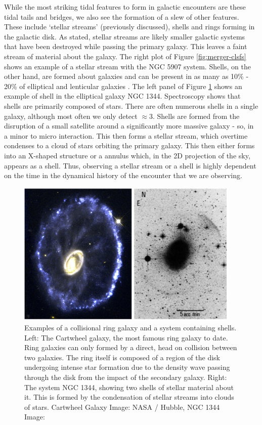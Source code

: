 While the most striking tidal features to form in galactic encounters are these tidal tails and bridges, we also see the formation of a slew of other features. These include `stellar streams' (previously discussed), shells and rings forming in the galactic disk. As stated, stellar streams are likely smaller galactic systems that have been destroyed while passing the primary galaxy. This leaves a faint stream of material about the galaxy. The right plot of Figure \ref{fig:merger-clsfs} shows an example of a stellar stream with the NGC 5907 system. Shells, on the other hand, are formed about galaxies and can be present in as many as 10\% - 20\% of elliptical and lenticular galaxies \citep{1983ApJ...274..534M, 2013ApJ...765...28A}. The left panel of Figure \ref{fig:tidal-features-ex} shows an example of shell in the elliptical galaxy NGC 1344. Spectroscopy shows that shells are primarily composed of stars. There are often numerous shells in a single galaxy, although most often we only detect $\approx$3. Shells are formed from the disruption of a small satellite around a significantly more massive galaxy - so, in a minor to micro interaction. This then forms a stellar stream, which overtime condenses to a cloud of stars orbiting the primary galaxy. This then either forms into an X-shaped structure or a annulus which, in the 2D projection of the sky, appears as a shell. Thus, observing a stellar stream or a shell is highly dependent on the time in the dynamical history of the encounter that we are observing.

\begin{figure}
    \centering
    \includegraphics[width=0.95\textwidth]{Introduction/figures/shells-rings.jpg}
    \caption{Examples of a collisional ring galaxy and a system containing shells. Left: The Cartwheel galaxy, the most famous ring galaxy to date. Ring galaxies can only formed by a direct, head on collision between two galaxies. The ring itself is composed of a region of the disk undergoing intense star formation due to the density wave passing through the disk from the impact of the secondary galaxy. Right: The system NGC 1344, showing two shells of stellar material about it. This is formed by the condensation of stellar streams into clouds of stars. Cartwheel Galaxy Image: NASA / Hubble, NGC 1344 Image: \citet{1983ApJ...274..534M}}
    \label{fig:tidal-features-ex}
\end{figure}

